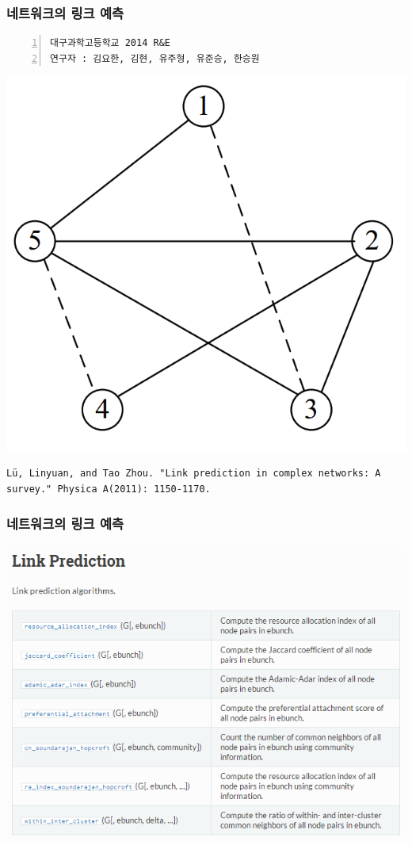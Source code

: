 \documentclass{beamer}
\begin{document}
\begin{frame}[fragile]
\frametitle{네트워크의 링크 예측}
\begin{block}{}
	\begin{Verbatim}[numbers=left,commandchars=\\\{\}]
대구과학고등학교 2014 R&E
연구자 : 김요한, 김현, 유주형, 유준승, 한승원
	\end{Verbatim}
\end{block}
\begin{center}
\includegraphics[scale=0.37]{prediction.png}
\end{center}
\tiny
\begin{Verbatim}
Lü, Linyuan, and Tao Zhou. "Link prediction in complex networks: A survey." Physica A(2011): 1150-1170.
\end{Verbatim}
\end{frame}

\begin{frame}[fragile]
\frametitle{네트워크의 링크 예측}
\begin{center}
\includegraphics[scale=0.7]{link_prediction.png}
\end{center}
\end{frame}
\end{document}
